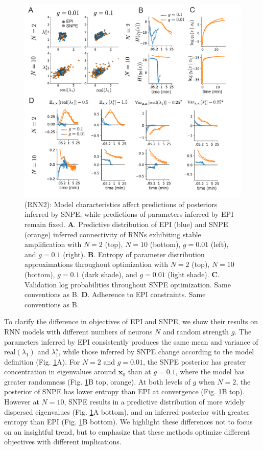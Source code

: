 \documentclass[11pt]{article}
\begin{document}
\begin{figure}
\begin{center}
\includegraphics[scale=0.8]{figures/figRNN2/figRNN2.pdf}
\end{center}
\caption{\small (RNN2): Model characteristics affect predictions of posteriors inferred by SNPE, while predictions of parameters inferred by EPI remain fixed.
\textbf{A}. Predictive distribution of EPI (blue) and SNPE (orange) inferred connectivity of RNNs exhibiting stable amplification with $N=2$ (top), $N=10$ (bottom), $g=0.01$ (left), and $g=0.1$ (right).
\textbf{B}. Entropy of parameter distribution approximations throughout optimization with $N=2$ (top), $N=10$ (bottom), $g=0.1$ (dark shade), and $g=0.01$ (light shade).
\textbf{C}. Validation log probabilities throughout SNPE optimization. Same conventions as B.
\textbf{D}. Adherence to EPI constraints. Same conventions as B.
}
\label{fig:RNN2}
\end{figure}

To clarify the difference in objectives of EPI and SNPE, we show their results on RNN models with different numbers of neurons $N$ and random strength $g$.  
The parameters inferred by EPI consistently produces the same mean and variance of $\text{real}(\lambda_1)$ and $\lambda_1^s$, while those inferred by SNPE change according to the model definition (Fig. \ref{fig:RNN2}A).
For $N=2$ and $g=0.01$, the SNPE posterior has greater concentration in eigenvalues around $\mathbf{x}_0$ than at $g=0.1$, where the model has greater randomness (Fig. \ref{fig:RNN2}B top, orange).
At both levels of $g$ when $N=2$, the posterior of SNPE has lower entropy than EPI at convergence (Fig. \ref{fig:RNN2}B top).
However at $N=10$, SNPE results in a predictive distribution of more widely dispersed eigenvalues (Fig. \ref{fig:RNN2}A bottom), and an inferred posterior with greater entropy than EPI (Fig. \ref{fig:RNN2}B bottom).
We highlight these differences not to focus on an insightful trend, but to emphasize that these methods optimize different objectives with different implications.
\end{document}
